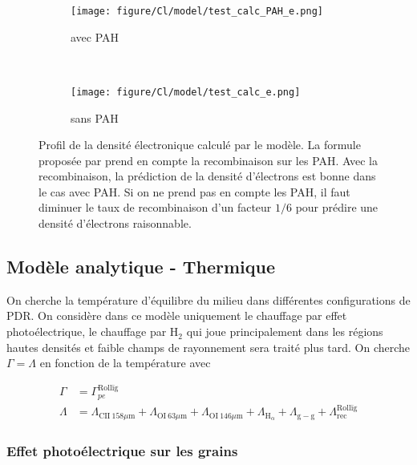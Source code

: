 \begin{figure}[htbp]
    \centering
    \begin{subfigure}[t]{0.45\textwidth} %
        \centering \texttt{[image: figure/Cl/model/test\_calc\_PAH\_e.png]}
        \caption{avec PAH}
    \end{subfigure}
    ~ 
    \begin{subfigure}[t]{0.45\textwidth}
        \centering \texttt{[image: figure/Cl/model/test\_calc\_e.png]}
        \caption{sans PAH}
    \end{subfigure}
    \caption{Profil de la densité électronique calculé par le modèle. La formule proposée par \cite{Weingartner_2001} prend en compte la recombinaison sur les PAH. Avec la recombinaison, la prédiction de la densité d'électrons est bonne dans le cas avec PAH. Si on ne prend pas en compte les PAH, il faut diminuer le taux de recombinaison d'un facteur $1/6$ pour prédire une densité d'électrons raisonnable.}
    \label{fig:Cl:model:rec}
\end{figure}



\subsection{Modèle analytique - Thermique}

On cherche la température d'équilibre du milieu dans différentes configurations de PDR. On considère dans ce modèle uniquement le chauffage par effet photoélectrique, le chauffage par $\mathrm{H}_2$ qui joue principalement dans les régions hautes densités et faible champs de rayonnement sera traité plus tard. On cherche $\Gamma = \Lambda $ en fonction de la température avec

\begin{equation}
    \begin{split}
        \Gamma &= \Gamma_{pe}^{\mathrm{Rollïg}} \\
        \Lambda &=   \Lambda_{\mathrm{CII}\ 158 \mu \mathrm{m}} + \Lambda_{\mathrm{OI}\ 63 \mu \mathrm{m}} + \Lambda_{\mathrm{OI}\ 146 \mu \mathrm{m}}  + \Lambda_{\mathrm{H}_\alpha} + \Lambda_{\mathrm{g}-\mathrm{g}} + \Lambda_{\mathrm{rec}}^{\mathrm{Rollïg}}
    \end{split}
\end{equation}


\subsubsection{Effet photoélectrique sur les grains}

